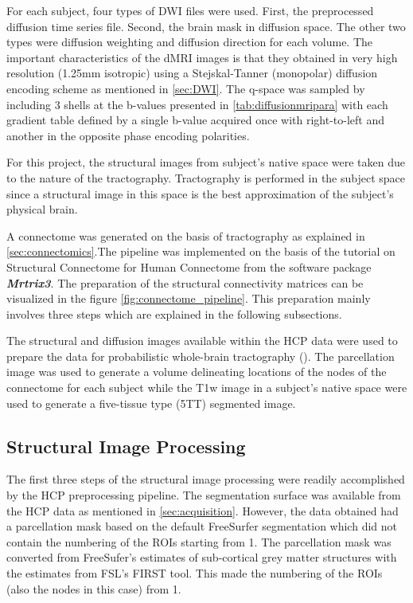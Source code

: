 \documentclass[msthesis.tex]{subfiles}
\begin{document}
For each subject, four types of DWI files were used. First, the preprocessed diffusion time series file. Second, the brain mask in diffusion space. The other two types were diffusion weighting and diffusion direction for each volume. The important characteristics of the dMRI images is that they obtained in very high resolution (1.25mm isotropic) using a Stejskal-Tanner (monopolar) diffusion encoding scheme as mentioned in \autoref{sec:DWI}. The q-space was sampled by including 3 shells at the b-values presented in \autoref{tab:diffusionmripara} with each gradient table defined by a single b-value acquired once with right-to-left and another in the opposite phase encoding polarities. 

For this project, the structural images from subject's native space were taken due to the nature of the tractography. Tractography is performed in the subject space since a structural image in this space is the best approximation of the subject's physical brain. 

A connectome was generated on the basis of tractography as explained in \autoref{sec:connectomics}.The pipeline was implemented on the basis of the tutorial on Structural Connectome for Human Connectome from the software package \textbf{\textit{Mrtrix3}}. The preparation of the structural connectivity matrices can be visualized in the figure \autoref{fig:connectome_pipeline}. This preparation mainly involves three steps which are explained in the following subsections.

The structural and diffusion images available within the HCP data were used to prepare the data for probabilistic whole-brain tractography (\cite{parker2003framework}). The parcellation image was used to generate a volume delineating locations of the nodes of the connectome for each subject while the T1w image in a subject's native space were used to generate a five-tissue type (5TT) segmented image.

\subsection{Structural Image Processing}
\label{subsec:struct_diff}

The first three steps of the structural image processing were readily accomplished by the HCP preprocessing pipeline. The segmentation surface was available from the HCP data as mentioned in \autoref{sec:acquisition}. However, the data obtained had a parcellation mask based on the default FreeSurfer segmentation which did not contain the numbering of the ROIs starting from 1. The parcellation mask was converted from FreeSufer's estimates of sub-cortical grey matter structures with the estimates from FSL's FIRST tool. This made the numbering of the ROIs (also the nodes in this case) from 1. 
\end{document}
